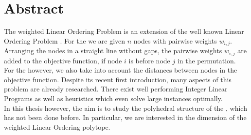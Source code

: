 \vspace*{0.2cm}
\section*{Abstract}

The weighted Linear Ordering Problem \wLOPN is an extension of the well known Linear Ordering Problem \LOPN. For the \LOP we are given $n$ nodes with pairwise weights $w_{i,j}$. Arranging the nodes in a straight line without gaps, the pairwise weights $w_{i,j}$ are added to the objective function, if node $i$ is before node $j$ in the permutation.\\

For the \wLOP however, we also take into account the distances between nodes in the objective function. Despite its recent first introduction, many aspects of this problem are already researched. There exist well performing Integer Linear Programs as well as heuristics which even solve large instances optimally. \\

In this thesis however, the aim is to study the polyhedral structure of the \wLOP, which has not been done before. In particular, we are interested in the dimension of the weighted Linear Ordering polytope.
